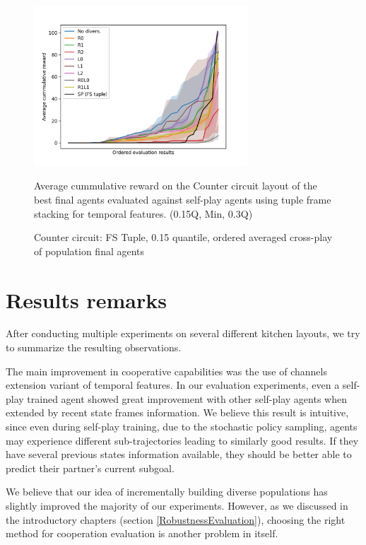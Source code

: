 \begin{figure}[!ht]
    \centering
    \includegraphics*[width=8cm]{../img/CounterCircuitFSTupleOrderedQ15.png}

    \caption{Counter circuit: FS Tuple, 0.15 quantile, ordered averaged cross-play of population final agents}
    \label{CounterCircuitFSTupleOrderedQ15}
    \medskip
    \small 
    Average cummulative reward on the Counter circuit layout of the best final agents evaluated against self-play agents using tuple frame stacking for temporal features.
    (0.15Q, Min, 0.3Q)

\end{figure}



\section{Results remarks}

After conducting multiple experiments on several different kitchen layouts, we try to summarize the resulting observations.

The main improvement in cooperative capabilities was the use of channels extension variant of temporal features.
In our evaluation experiments, even a self-play trained agent showed great improvement with other self-play agents when extended by recent state frames information.
We believe this result is intuitive, since even during self-play training, due to the stochastic policy sampling, agents may experience different sub-trajectories leading to similarly good results.
If they have several previous states information available, they should be better able to predict their partner's current subgoal.

We believe that our idea of incrementally building diverse populations has slightly improved the majority of our experiments.
However, as we discussed in the introductory chapters (section \ref{RobustnessEvaluation}), choosing the right method for cooperation evaluation is another problem in itself.

